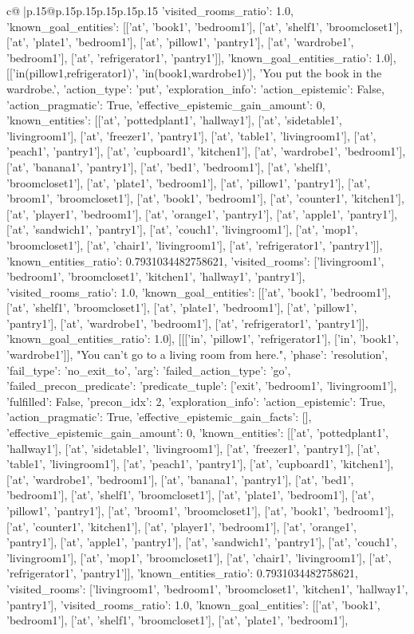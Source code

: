 \documentclass{article}
\begin{document}
{\begin{supertabular}{c@{$\;$}|p{.15\linewidth}@{}p{.15\linewidth}p{.15\linewidth}p{.15\linewidth}p{.15\linewidth}p{.15\linewidth}}
{{{'visited_rooms_ratio': 1.0, 'known_goal_entities': [['at', 'book1', 'bedroom1'], ['at', 'shelf1', 'broomcloset1'], ['at', 'plate1', 'bedroom1'], ['at', 'pillow1', 'pantry1'], ['at', 'wardrobe1', 'bedroom1'], ['at', 'refrigerator1', 'pantry1']], 'known_goal_entities_ratio': 1.0}}], [['in(pillow1,refrigerator1)', 'in(book1,wardrobe1)'], 'You put the book in the wardrobe.', {'action_type': 'put', 'exploration_info': {'action_epistemic': False, 'action_pragmatic': True, 'effective_epistemic_gain_amount': 0, 'known_entities': [['at', 'pottedplant1', 'hallway1'], ['at', 'sidetable1', 'livingroom1'], ['at', 'freezer1', 'pantry1'], ['at', 'table1', 'livingroom1'], ['at', 'peach1', 'pantry1'], ['at', 'cupboard1', 'kitchen1'], ['at', 'wardrobe1', 'bedroom1'], ['at', 'banana1', 'pantry1'], ['at', 'bed1', 'bedroom1'], ['at', 'shelf1', 'broomcloset1'], ['at', 'plate1', 'bedroom1'], ['at', 'pillow1', 'pantry1'], ['at', 'broom1', 'broomcloset1'], ['at', 'book1', 'bedroom1'], ['at', 'counter1', 'kitchen1'], ['at', 'player1', 'bedroom1'], ['at', 'orange1', 'pantry1'], ['at', 'apple1', 'pantry1'], ['at', 'sandwich1', 'pantry1'], ['at', 'couch1', 'livingroom1'], ['at', 'mop1', 'broomcloset1'], ['at', 'chair1', 'livingroom1'], ['at', 'refrigerator1', 'pantry1']], 'known_entities_ratio': 0.7931034482758621, 'visited_rooms': ['livingroom1', 'bedroom1', 'broomcloset1', 'kitchen1', 'hallway1', 'pantry1'], 'visited_rooms_ratio': 1.0, 'known_goal_entities': [['at', 'book1', 'bedroom1'], ['at', 'shelf1', 'broomcloset1'], ['at', 'plate1', 'bedroom1'], ['at', 'pillow1', 'pantry1'], ['at', 'wardrobe1', 'bedroom1'], ['at', 'refrigerator1', 'pantry1']], 'known_goal_entities_ratio': 1.0}}], [[['in', 'pillow1', 'refrigerator1'], ['in', 'book1', 'wardrobe1']], "You can't go to a living room from here.", {'phase': 'resolution', 'fail_type': 'no_exit_to', 'arg': {'failed_action_type': 'go', 'failed_precon_predicate': {'predicate_tuple': ['exit', 'bedroom1', 'livingroom1'], 'fulfilled': False, 'precon_idx': 2}}, 'exploration_info': {'action_epistemic': True, 'action_pragmatic': True, 'effective_epistemic_gain_facts': [], 'effective_epistemic_gain_amount': 0, 'known_entities': [['at', 'pottedplant1', 'hallway1'], ['at', 'sidetable1', 'livingroom1'], ['at', 'freezer1', 'pantry1'], ['at', 'table1', 'livingroom1'], ['at', 'peach1', 'pantry1'], ['at', 'cupboard1', 'kitchen1'], ['at', 'wardrobe1', 'bedroom1'], ['at', 'banana1', 'pantry1'], ['at', 'bed1', 'bedroom1'], ['at', 'shelf1', 'broomcloset1'], ['at', 'plate1', 'bedroom1'], ['at', 'pillow1', 'pantry1'], ['at', 'broom1', 'broomcloset1'], ['at', 'book1', 'bedroom1'], ['at', 'counter1', 'kitchen1'], ['at', 'player1', 'bedroom1'], ['at', 'orange1', 'pantry1'], ['at', 'apple1', 'pantry1'], ['at', 'sandwich1', 'pantry1'], ['at', 'couch1', 'livingroom1'], ['at', 'mop1', 'broomcloset1'], ['at', 'chair1', 'livingroom1'], ['at', 'refrigerator1', 'pantry1']], 'known_entities_ratio': 0.7931034482758621, 'visited_rooms': ['livingroom1', 'bedroom1', 'broomcloset1', 'kitchen1', 'hallway1', 'pantry1'], 'visited_rooms_ratio': 1.0, 'known_goal_entities': [['at', 'book1', 'bedroom1'], ['at', 'shelf1', 'broomcloset1'], ['at', 'plate1', 'bedroom1'], }}}
\end{supertabular}}
\end{document}

